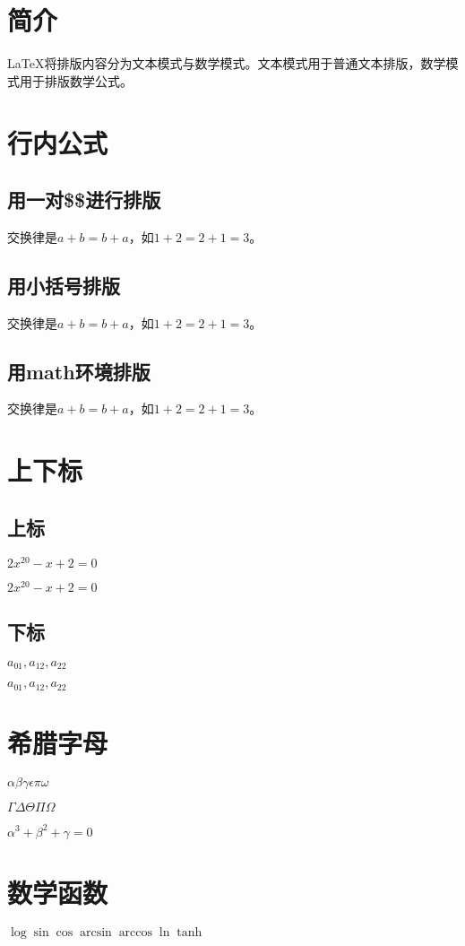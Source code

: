 \documentclass{article} %
\begin{document}
	\section{简介}
	\LaTeX 将排版内容分为文本模式与数学模式。文本模式用于普通文本排版，数学模式用于排版数学公式。
	\section{行内公式}
	\subsection{用一对\$\$进行排版}
	交换律是$a+b=b+a$，如$1+2=2+1=3$。
	\subsection{用小括号排版}
	交换律是\(a+b=b+a\)，如\(1+2=2+1=3\)。
	\subsection{用math环境排版}
	交换律是\begin{math}a+b=b+a\end{math}，如\begin{math}1+2=2+1=3\end{math}。
	\section{上下标}
	\subsection{上标}
	$2x^20-x+2=0$
	
	$2x^{20}-x+2=0$
	\subsection{下标}
	$a_01, a_12, a_22$
	
	$a_{01}, a_{12}, a_{22}$
	\section{希腊字母}
	$\alpha \beta \gamma \epsilon \pi \omega $
	
	$\Gamma \Delta \Theta \Pi \Omega$
	
	$\alpha^3+\beta^2+\gamma=0$
	\section{数学函数}
	$\log \sin \cos \arcsin \arccos \ln \tanh$
	
\end{document}
